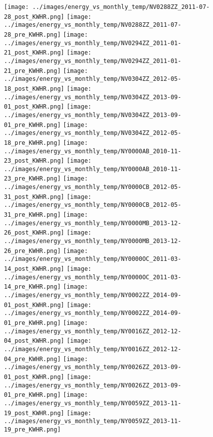 \clearpage
\begin{figure}
\centering
\texttt{[image: ../images/energy\_vs\_monthly\_temp/NV0288ZZ\_2011-07-28\_post\_KWHR.png]}
\texttt{[image: ../images/energy\_vs\_monthly\_temp/NV0288ZZ\_2011-07-28\_pre\_KWHR.png]}
\texttt{[image: ../images/energy\_vs\_monthly\_temp/NV0294ZZ\_2011-01-21\_post\_KWHR.png]}
\texttt{[image: ../images/energy\_vs\_monthly\_temp/NV0294ZZ\_2011-01-21\_pre\_KWHR.png]}
\texttt{[image: ../images/energy\_vs\_monthly\_temp/NV0304ZZ\_2012-05-18\_post\_KWHR.png]}
\texttt{[image: ../images/energy\_vs\_monthly\_temp/NV0304ZZ\_2013-09-01\_post\_KWHR.png]}
\texttt{[image: ../images/energy\_vs\_monthly\_temp/NV0304ZZ\_2013-09-01\_pre\_KWHR.png]}
\texttt{[image: ../images/energy\_vs\_monthly\_temp/NV0304ZZ\_2012-05-18\_pre\_KWHR.png]}
\texttt{[image: ../images/energy\_vs\_monthly\_temp/NY0000AB\_2010-11-23\_post\_KWHR.png]}
\texttt{[image: ../images/energy\_vs\_monthly\_temp/NY0000AB\_2010-11-23\_pre\_KWHR.png]}
\texttt{[image: ../images/energy\_vs\_monthly\_temp/NY0000CB\_2012-05-31\_post\_KWHR.png]}
\texttt{[image: ../images/energy\_vs\_monthly\_temp/NY0000CB\_2012-05-31\_pre\_KWHR.png]}
\texttt{[image: ../images/energy\_vs\_monthly\_temp/NY0000MB\_2013-12-26\_post\_KWHR.png]}
\texttt{[image: ../images/energy\_vs\_monthly\_temp/NY0000MB\_2013-12-26\_pre\_KWHR.png]}
\texttt{[image: ../images/energy\_vs\_monthly\_temp/NY0000OC\_2011-03-14\_post\_KWHR.png]}
\texttt{[image: ../images/energy\_vs\_monthly\_temp/NY0000OC\_2011-03-14\_pre\_KWHR.png]}
\texttt{[image: ../images/energy\_vs\_monthly\_temp/NY0002ZZ\_2014-09-01\_post\_KWHR.png]}
\texttt{[image: ../images/energy\_vs\_monthly\_temp/NY0002ZZ\_2014-09-01\_pre\_KWHR.png]}
\texttt{[image: ../images/energy\_vs\_monthly\_temp/NY0016ZZ\_2012-12-04\_post\_KWHR.png]}
\texttt{[image: ../images/energy\_vs\_monthly\_temp/NY0016ZZ\_2012-12-04\_pre\_KWHR.png]}
\texttt{[image: ../images/energy\_vs\_monthly\_temp/NY0026ZZ\_2013-09-01\_post\_KWHR.png]}
\texttt{[image: ../images/energy\_vs\_monthly\_temp/NY0026ZZ\_2013-09-01\_pre\_KWHR.png]}
\texttt{[image: ../images/energy\_vs\_monthly\_temp/NY0059ZZ\_2013-11-19\_post\_KWHR.png]}
\texttt{[image: ../images/energy\_vs\_monthly\_temp/NY0059ZZ\_2013-11-19\_pre\_KWHR.png]}
\end{figure}
